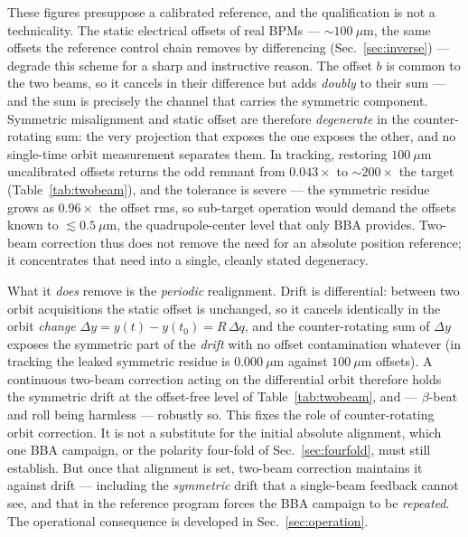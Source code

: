 \documentclass[aps,prab,reprint,superscriptaddress,nofootinbib]{revtex4-2}
\begin{document}
These figures presuppose a calibrated reference, and the qualification is not a
technicality.  The static electrical offsets of real BPMs --- $\sim\!100~\mu$m,
the same offsets the reference control chain removes by differencing
(Sec.~\ref{sec:inverse}) --- degrade this scheme for a sharp and instructive
reason.  The offset $b$ is common to the two beams, so it cancels in their
difference but adds \emph{doubly} to their sum --- and the sum is precisely the
channel that carries the symmetric component.  Symmetric misalignment and static
offset are therefore \emph{degenerate} in the counter-rotating sum: the very
projection that exposes the one exposes the other, and no single-time orbit
measurement separates them.  In tracking, restoring $100~\mu$m uncalibrated
offsets returns the odd remnant from $0.043\times$ to $\sim\!200\times$ the target
(Table~\ref{tab:twobeam}), and the tolerance is severe --- the symmetric residue
grows as $0.96\times$ the offset rms, so sub-target operation would demand the
offsets known to $\lesssim\!0.5~\mu$m, the quadrupole-center level that only BBA
provides.  Two-beam correction thus does not remove the need for an absolute
position reference; it concentrates that need into a single, cleanly stated
degeneracy.

What it \emph{does} remove is the \emph{periodic} realignment.  Drift is
differential: between two orbit acquisitions the static offset is unchanged, so
it cancels identically in the orbit \emph{change}
$\Delta y = y(t)-y(t_0) = R\,\Delta q$, and the counter-rotating sum of
$\Delta y$ exposes the symmetric part of the \emph{drift} with no offset
contamination whatever (in tracking the leaked symmetric residue is
$0.000~\mu$m against $100~\mu$m offsets).  A continuous two-beam correction
acting on the differential orbit therefore holds the symmetric drift at the
offset-free level of Table~\ref{tab:twobeam}, and --- $\beta$-beat and roll being
harmless --- robustly so.  This fixes the role of counter-rotating orbit
correction.  It is not a substitute for the initial absolute alignment, which
one BBA campaign, or the polarity four-fold of Sec.~\ref{sec:fourfold}, must
still establish.  But once that alignment is set, two-beam correction maintains
it against drift --- including the \emph{symmetric} drift that a single-beam
feedback cannot see, and that in the reference program forces the BBA campaign to
be \emph{repeated}.  The operational consequence is developed in
Sec.~\ref{sec:operation}.
\end{document}
